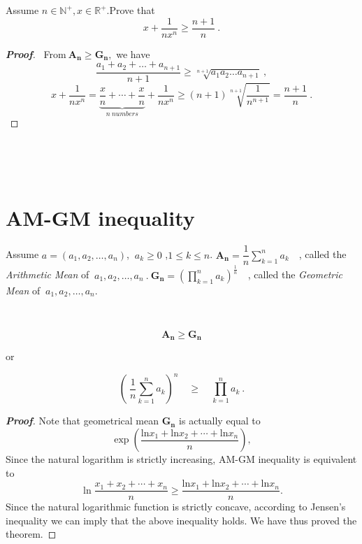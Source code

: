 \documentclass[a4paper]{report}
\begin{document}
	\begin{myex}
	
	Assume $n\in\mathbb{N}^+,x\in\mathbb{R}^+$.Prove that
	\[x+\frac{1}{nx^n}\geqslant\frac{n+1}{n}\ .\]
	
    \end{myex}

\begin{proof}[\bf{Proof}]
	\ From$\ \mathbf{A_n}\geqslant \mathbf{G_n}, $ we have
	\[\frac{a_1+a_2+\dots+a_{n+1}}{n+1}\geqslant\sqrt[n+1]{a_1a_2\dots a_{n+1}}\  ,\]
	\[x+\frac{1}{nx^n}=\underbrace{\frac{x}{n}+\cdots +\frac{x}{n}}_{n\ numbers}+\frac{1}{nx^n}
	\geqslant (n+1)\sqrt[n+1]{\frac{1}{n^{n+1}}}
	=\frac{n+1}{n}\ . \]
\end{proof}	
	
    
    \par  \ \par  \ 
    
    \section{AM-GM inequality}
	
	
	\begin{defi}
		
	Assume $a=(a_1,a_2,\dots ,a_n)$,
	$\ a_k\geqslant 0$
	,$1\leqslant k\leqslant n$.
	$\mathbf{A_n}=\dfrac{1}{n}\sum\limits_{k=1}^n a_k\quad$,
	called the \emph{Arithmetic Mean} of
	$\ a_1,a_2,\dots ,a_n\ .\ 
	\mathbf{G_n}=(\prod\limits_{k=1}^n a_k)^\frac{1}{n}\quad$,
	called the \emph{Geometric Mean} of 
	$\ a_1,a_2,\dots ,a_n$.
	
	\end{defi}
	\par  \ 

\begin{thr}
	\begin{equation}
	\mathbf{A_n}\geqslant \mathbf{G_n}	
	\end{equation}
	
	or
	
	\begin{equation}
	\left( \ \frac{1}{n}\sum_{k=1}^n a_k \right)^n\quad\geqslant\quad \prod\limits_{k=1}^n a_k \  .
    \end{equation}
\end{thr}

	
\begin{proof}[\bf{Proof}]
Note that geometrical mean $\mathbf{G_n}$ is actually equal to 
\[ \exp \left(\frac{\text{ln}x_{1}+\text{ln}x_{2}+\cdots +\text{ln}x_{n}}{n} \right),\]
Since the natural logarithm is strictly increasing, AM-GM inequality is equivalent to
\[\ln \frac{x_{1}+x_{2}+\cdots +x_{n}}{n} \geqslant \frac{\text{ln}x_{1}+\text{ln}x_{2}+\cdots +\text{ln}x_{n}}{n} .\]
Since the natural logarithmic function is strictly concave, according to Jensen's inequality we can imply that the above inequality holds. We have thus proved the theorem.

\end{proof}
	\par  \ 
\end{document}
